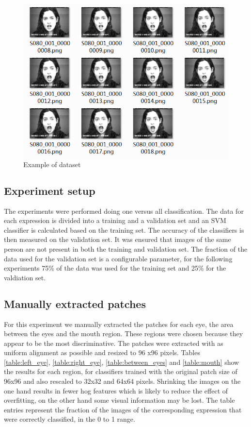 \begin{figure}[h!]
\centering
\includegraphics[scale=0.55]{img/example.png}
\caption{Example of dataset}
\label{Example of dataset}
\end{figure}

\subsection{Experiment setup}
The experiments were performed doing one versus all classification. The data for each expression is divided into a training and a validation set and an SVM
classifier is calculated based on the training set. The accuracy of the classifiers is then measured on the validation set. It was ensured that images of the same
person are not present in both the training and validation set. The fraction of the data used for the validation set is a configurable parameter, for the 
following experiments 75\% of the data was used for the training set and 25\% for the valdiation set. 

\subsection{Manually extracted patches}
For this experiment we manually extracted the patches for each eye, the area between the eyes and the mouth region. These regions were chosen because they 
appear to be the most discriminative. The patches were extracted with as uniform alignment as possible and resized to 96 x96 pixels. 
Tables \ref{table:left_eye}, \ref{table:right_eye}, \ref{table:between_eyes} and \ref{table:mouth} show the results for each region, for classifiers trained 
with the original patch size of 96x96 and also rescaled to 32x32 and 64x64 pixels. Shrinking the images on the one hand results in fewer hog features which
is likely to reduce the effect of overfitting, on the other hand some visual information may be lost. The table entries represent the fraction of the
images of the corresponding expression that were correctly classified, in the 0 to 1 range.

